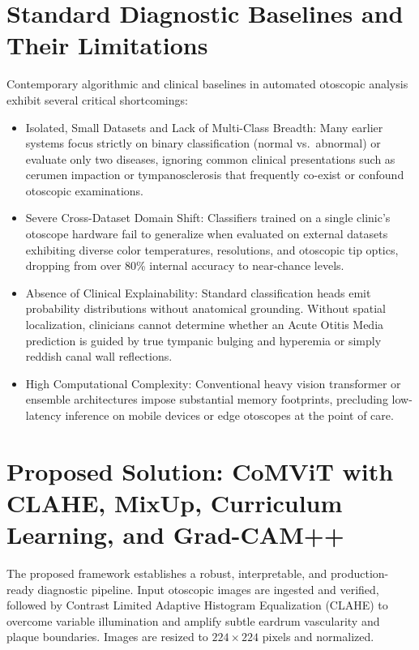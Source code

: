 \documentclass[12pt,a4paper]{report}
\renewcommand{\textbf}[1]{#1}
\begin{document}
\section{Standard Diagnostic Baselines and Their Limitations}
Contemporary algorithmic and clinical baselines in automated otoscopic analysis exhibit several critical shortcomings:
\begin{itemize}
    \item \textbf{Isolated, Small Datasets and Lack of Multi-Class Breadth:} Many earlier systems focus strictly on binary classification (normal vs.\ abnormal) or evaluate only two diseases, ignoring common clinical presentations such as cerumen impaction or tympanosclerosis that frequently co-exist or confound otoscopic examinations.
    \item \textbf{Severe Cross-Dataset Domain Shift:} Classifiers trained on a single clinic's otoscope hardware fail to generalize when evaluated on external datasets exhibiting diverse color temperatures, resolutions, and otoscopic tip optics, dropping from over 80\% internal accuracy to near-chance levels.
    \item \textbf{Absence of Clinical Explainability:} Standard classification heads emit probability distributions without anatomical grounding. Without spatial localization, clinicians cannot determine whether an Acute Otitis Media prediction is guided by true tympanic bulging and hyperemia or simply reddish canal wall reflections.
    \item \textbf{High Computational Complexity:} Conventional heavy vision transformer or ensemble architectures impose substantial memory footprints, precluding low-latency inference on mobile devices or edge otoscopes at the point of care.
\end{itemize}

\section{Proposed Solution: CoMViT with CLAHE, MixUp, Curriculum Learning, and Grad-CAM++}
The proposed framework establishes a robust, interpretable, and production-ready diagnostic pipeline. Input otoscopic images are ingested and verified, followed by \textbf{Contrast Limited Adaptive Histogram Equalization (CLAHE)} to overcome variable illumination and amplify subtle eardrum vascularity and plaque boundaries. Images are resized to $224 \times 224$ pixels and normalized.
\end{document}
